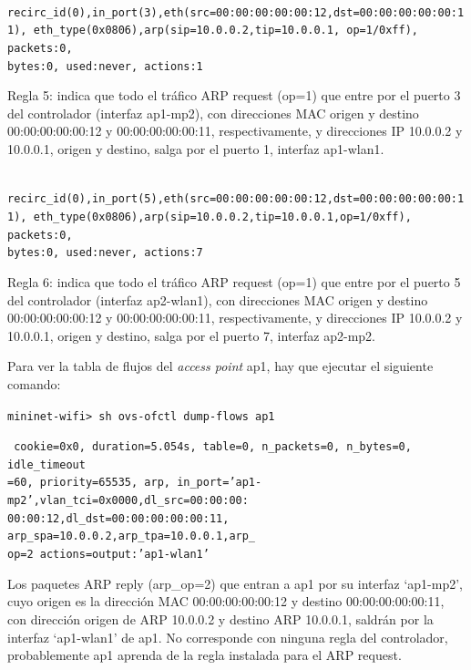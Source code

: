 \documentclass[a4paper,12pt,twoside,spanish]{book}
\begin{document}
\noindent\texttt{
	recirc\_id(0),in\_port(3),eth(src=00:00:00:00:00:12,dst=00:00:00:00:00:11),
	eth\_type(0x0806),arp(sip=10.0.0.2,tip=10.0.0.1,
	op=1/0xff), packets:0,\\
	bytes:0, used:never, actions:1
}

Regla 5: indica que todo el tráfico ARP request (op=1) que entre por el puerto 3 del controlador (interfaz ap1-mp2), con direcciones MAC origen y destino 00:00:00:00:00:12 y 00:00:00:00:00:11, respectivamente, y direcciones IP 10.0.0.2 y 10.0.0.1, origen y destino, salga por el puerto 1, interfaz ap1-wlan1.\par

\noindent\texttt{
	recirc\_id(0),in\_port(5),eth(src=00:00:00:00:00:12,dst=00:00:00:00:00:11),
	eth\_type(0x0806),arp(sip=10.0.0.2,tip=10.0.0.1,op=1/0xff), packets:0, \\
	bytes:0, used:never, actions:7
}

Regla 6: indica que todo el tráfico ARP request (op=1) que entre por el puerto 5 del controlador (interfaz ap2-wlan1), con direcciones MAC origen y destino 00:00:00:00:00:12 y 00:00:00:00:00:11, respectivamente, y direcciones IP 10.0.0.2 y 10.0.0.1, origen y destino, salga por el puerto 7, interfaz ap2-mp2.\par 

\hspace{1cm}

Para ver la tabla de flujos del \textit{access point} ap1, hay que ejecutar el siguiente comando:\par 

\begin{center}
	\texttt{mininet-wifi> sh ovs-ofctl dump-flows ap1}
\end{center}

\noindent\texttt{
	cookie=0x0, duration=5.054s, table=0, n\_packets=0, n\_bytes=0, idle\_timeout\\
	=60, priority=65535, arp,
	in\_port='ap1-mp2',vlan\_tci=0x0000,dl\_src=00:00:00:\\
	00:00:12,dl\_dst=00:00:00:00:00:11,
	arp\_spa=10.0.0.2,arp\_tpa=10.0.0.1,arp\_\\
	op=2 actions=output:'ap1-wlan1'
}
 
Los paquetes ARP reply (arp\_op=2) que entran a ap1 por su interfaz ‘ap1-mp2’, cuyo origen es la dirección MAC 00:00:00:00:00:12 y destino 00:00:00:00:00:11, con dirección origen de ARP 10.0.0.2 y destino ARP 10.0.0.1, saldrán por la interfaz ‘ap1-wlan1’ de ap1. No corresponde con ninguna regla del controlador, probablemente ap1 aprenda de la regla instalada para el ARP request.\par 
\end{document}
